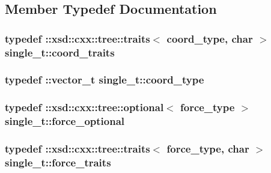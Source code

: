 \subsection{Member Typedef Documentation}
\subsubsection[{\texorpdfstring{coord\+\_\+traits}{coord_traits}}]{\setlength{\rightskip}{0pt plus 5cm}typedef \+::xsd\+::cxx\+::tree\+::traits$<$ {\bf coord\+\_\+type}, char $>$ {\bf single\+\_\+t\+::coord\+\_\+traits}}\hypertarget{classsingle__t_aaf92d8da07f04ceb7cc4dbb9a750fb41}{}\label{classsingle__t_aaf92d8da07f04ceb7cc4dbb9a750fb41}
\subsubsection[{\texorpdfstring{coord\+\_\+type}{coord_type}}]{\setlength{\rightskip}{0pt plus 5cm}typedef \+::{\bf vector\+\_\+t} {\bf single\+\_\+t\+::coord\+\_\+type}}\hypertarget{classsingle__t_a07d764e683fbb0e8ddd97945f2c01270}{}\label{classsingle__t_a07d764e683fbb0e8ddd97945f2c01270}
\subsubsection[{\texorpdfstring{force\+\_\+optional}{force_optional}}]{\setlength{\rightskip}{0pt plus 5cm}typedef \+::xsd\+::cxx\+::tree\+::optional$<$ {\bf force\+\_\+type} $>$ {\bf single\+\_\+t\+::force\+\_\+optional}}\hypertarget{classsingle__t_a33128be3fe89ddbab885d0a205d35888}{}\label{classsingle__t_a33128be3fe89ddbab885d0a205d35888}
\subsubsection[{\texorpdfstring{force\+\_\+traits}{force_traits}}]{\setlength{\rightskip}{0pt plus 5cm}typedef \+::xsd\+::cxx\+::tree\+::traits$<$ {\bf force\+\_\+type}, char $>$ {\bf single\+\_\+t\+::force\+\_\+traits}}\hypertarget{classsingle__t_aeccb5e0ed757624999b2bb071e656aaa}{}\label{classsingle__t_aeccb5e0ed757624999b2bb071e656aaa}
